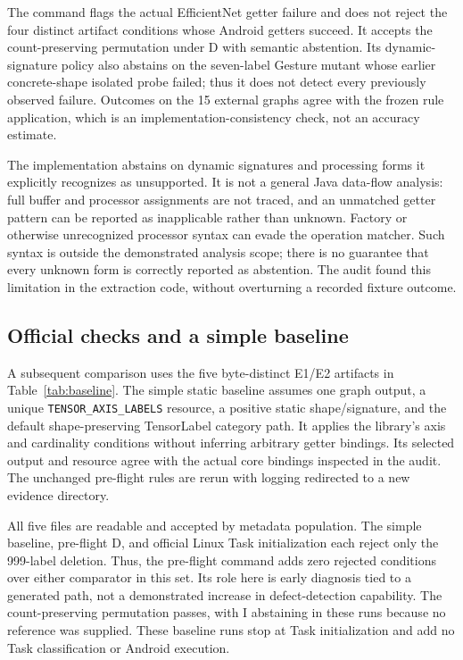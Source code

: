 \documentclass[10pt,twocolumn,letterpaper]{article}
\newcommand{\code}[1]{\texttt{#1}}
\begin{document}
The command flags the actual EfficientNet getter failure and does not reject the four distinct artifact conditions whose Android getters succeed. It accepts the count-preserving permutation under D with semantic abstention. Its dynamic-signature policy also abstains on the seven-label Gesture mutant whose earlier concrete-shape isolated probe failed; thus it does not detect every previously observed failure. Outcomes on the 15 external graphs agree with the frozen rule application, which is an implementation-consistency check, not an accuracy estimate.

The implementation abstains on dynamic signatures and processing forms it explicitly recognizes as unsupported. It is not a general Java data-flow analysis: full buffer and processor assignments are not traced, and an unmatched getter pattern can be reported as inapplicable rather than unknown. Factory or otherwise unrecognized processor syntax can evade the operation matcher. Such syntax is outside the demonstrated analysis scope; there is no guarantee that every unknown form is correctly reported as abstention. The audit found this limitation in the extraction code, without overturning a recorded fixture outcome.

\subsection{Official checks and a simple baseline}
A subsequent comparison uses the five byte-distinct E1/E2 artifacts in Table~\ref{tab:baseline}. The simple static baseline assumes one graph output, a unique \code{TENSOR\_AXIS\_LABELS} resource, a positive static shape/signature, and the default shape-preserving TensorLabel category path. It applies the library's axis and cardinality conditions without inferring arbitrary getter bindings. Its selected output and resource agree with the actual core bindings inspected in the audit. The unchanged pre-flight rules are rerun with logging redirected to a new evidence directory.

All five files are readable and accepted by metadata population. The simple baseline, pre-flight D, and official Linux Task initialization each reject only the 999-label deletion. Thus, the pre-flight command adds zero rejected conditions over either comparator in this set. Its role here is early diagnosis tied to a generated path, not a demonstrated increase in defect-detection capability. The count-preserving permutation passes, with I abstaining in these runs because no reference was supplied. These baseline runs stop at Task initialization and add no Task classification or Android execution.
\end{document}
